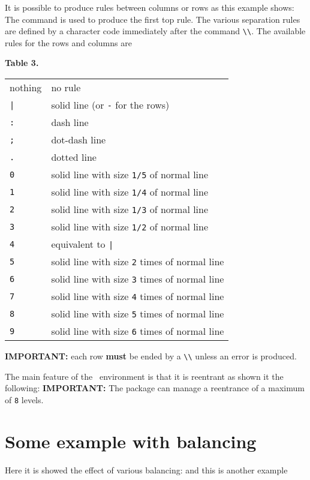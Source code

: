\documentclass[a4paper]{article}
\begin{document}
It is possible to produce rules between columns or rows as this 
example shows:
%
%
The command  is used to produce the first top rule. The 
various separation rules are defined by a character code immediately 
after the command \verb+\\+.
The available rules for the rows and columns are
%
\begin{center}
\textbf{Table 3.}\nobreak\\
\begin{tabular}{|l|l|}
\hline
nothing  & no rule \\
\verb+|+ & solid line (or \verb+-+ for the rows) \\
\verb+:+ & dash line \\
\verb+;+ & dot-dash line \\
\verb+.+ & dotted line \\
\verb+0+ & solid line with size \verb|1/5| of normal line \\
\verb+1+ & solid line with size \verb|1/4| of normal line \\
\verb+2+ & solid line with size \verb|1/3| of normal line \\
\verb+3+ & solid line with size \verb|1/2| of normal line \\
\verb+4+ & equivalent to \verb+|+ \\
\verb+5+ & solid line with size \verb|2| times of normal line \\
\verb+6+ & solid line with size \verb|3| times of normal line \\
\verb+7+ & solid line with size \verb|4| times of normal line \\
\verb+8+ & solid line with size \verb|5| times of normal line \\
\verb+9+ & solid line with size \verb|6| times of normal line \\
\hline
\end{tabular}
\end{center}

\textbf{IMPORTANT:} each row \textbf{must} be ended by a \verb+\\+ 
unless an error is produced.

The main feature of the ~environment
is that it is reentrant as shown it the following:
%
%
\textbf{IMPORTANT:} The package can manage a reentrance of a maximum 
of \verb|8| levels.


\section{Some example with balancing}
Here it is showed the effect of various balancing:
%
%
and this is another example
%
%
\end{document}
